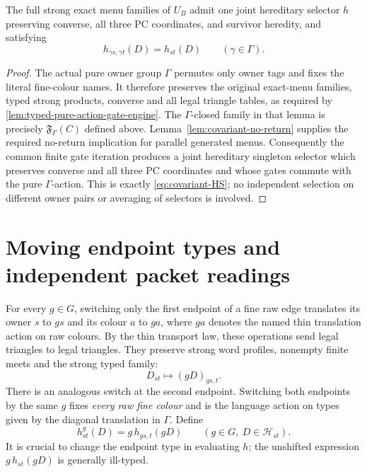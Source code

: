 \begin{theorem}
\label{thm:covariant-HS}
The full strong exact menu families of $U_B$ admit one joint
hereditary selector $h$ preserving converse, all three PC
coordinates, and survivor heredity, and satisfying
\begin{equation}\label{eq:covariant-HS}
        h_{\gamma s,\gamma t}(D)=h_{st}(D)
       \qquad(\gamma\in\Gamma).
\end{equation}
\end{theorem}
\begin{proof}
The actual pure owner group $\Gamma$ permutes only
owner tags and fixes the literal fine-colour names.  It therefore
preserves the original exact-menu families, typed strong products,
converse and all legal triangle tables, as required by
\cref{lem:typed-pure-action-gate-engine}.  The
$\Gamma$-closed family in that lemma is precisely
$\mathfrak F_\Gamma(C)$ defined above.
Lemma~\ref{lem:covariant-no-return} supplies the required
no-return implication for parallel generated menus.
Consequently the common finite gate iteration produces a joint
hereditary singleton selector which preserves converse and all
three PC coordinates and whose gates commute with the pure
$\Gamma$-action.  This is exactly
\eqref{eq:covariant-HS}; no independent selection on different
owner pairs or averaging of selectors is involved.
\end{proof}

\section{Moving endpoint types and independent packet readings}
\label{sec:moving-readings}

For every $g\in G$, switching only the first endpoint of a fine
raw edge translates its owner $s$ to $gs$ and its colour $a$ to
$ga$, where $ga$ denotes the named thin translation action on
raw colours.  By the thin transport law, these operations send
legal triangles to legal triangles.  They preserve strong word
profiles, nonempty finite meets and the strong typed family:
\[
        D_{st}\longmapsto (gD)_{gs,t}.
\]
There is an analogous switch at the second endpoint.  Switching
both endpoints by the same $g$ fixes \emph{every raw fine colour}
and is the language action on types given by the diagonal
translation in $\Gamma$.  Define
\begin{equation}\label{eq:shifted-reading}
         h^g_{st}(D)=g\,h_{gs,t}(gD)
         \qquad(g\in G,\ D\in\mathcal H_{st}).
\end{equation}
It is crucial to change the endpoint type in evaluating $h$;
the unshifted expression $g\,h_{st}(gD)$ is generally ill-typed.

